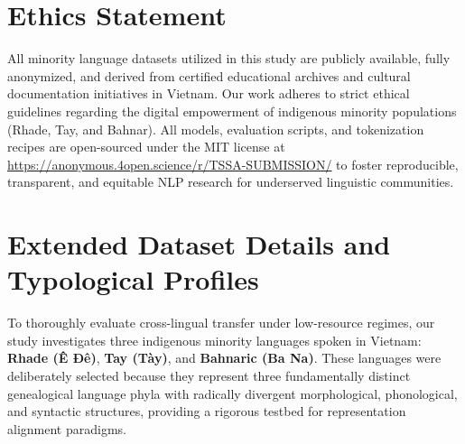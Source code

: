 \documentclass[11pt]{article}
\begin{document}
\section*{Ethics Statement}
All minority language datasets utilized in this study are publicly available, fully anonymized, and derived from certified educational archives and cultural documentation initiatives in Vietnam. Our work adheres to strict ethical guidelines regarding the digital empowerment of indigenous minority populations (Rhade, Tay, and Bahnar). All models, evaluation scripts, and tokenization recipes are open-sourced under the MIT license at \url{https://anonymous.4open.science/r/TSSA-SUBMISSION/} to foster reproducible, transparent, and equitable NLP research for underserved linguistic communities.



\newpage
\appendix

\section{Extended Dataset Details and Typological Profiles}
\label{sec:appendix_data}

To thoroughly evaluate cross-lingual transfer under low-resource regimes, our study investigates three indigenous minority languages spoken in Vietnam: \textbf{Rhade (Ê Đê)}, \textbf{Tay (Tày)}, and \textbf{Bahnaric (Ba Na)}. These languages were deliberately selected because they represent three fundamentally distinct genealogical language phyla with radically divergent morphological, phonological, and syntactic structures, providing a rigorous testbed for representation alignment paradigms.
\end{document}
